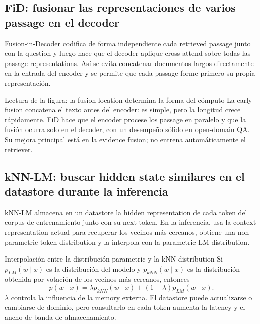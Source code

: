 
\subsection{FiD: fusionar las representaciones de varios passage en el decoder}

Fusion-in-Decoder codifica de forma independiente cada retrieved passage junto con la question y luego hace que el decoder aplique cross-attend sobre todas las passage representations. Así se evita concatenar documentos largos directamente en la entrada del encoder y se permite que cada passage forme primero su propia representación.


\begin{knowledgebox}{Lectura de la figura: la fusion location determina la forma del cómputo}
La early fusion concatena el texto antes del encoder: es simple, pero la longitud crece rápidamente. FiD hace que el encoder procese los passage en paralelo y que la fusión ocurra solo en el decoder, con un desempeño sólido en open-domain QA. Su mejora principal está en la evidence fusion; no entrena automáticamente el retriever.
\end{knowledgebox}

\subsection{kNN-LM: buscar hidden state similares en el datastore durante la inferencia}

kNN-LM almacena en un datastore la hidden representation de cada token del corpus de entrenamiento junto con su next token. En la inferencia, usa la context representation actual para recuperar los vecinos más cercanos, obtiene una non-parametric token distribution y la interpola con la parametric LM distribution.


\begin{importantbox}{Interpolación entre la distribución parametric y la kNN distribution}
Si $p_{LM}(w\mid x)$ es la distribución del modelo y $p_{kNN}(w\mid x)$ es la distribución obtenida por votación de los vecinos más cercanos, entonces
\[
p(w\mid x)=\lambda p_{kNN}(w\mid x)+(1-\lambda)p_{LM}(w\mid x).
\]
$\lambda$ controla la influencia de la memory externa. El datastore puede actualizarse o cambiarse de dominio, pero consultarlo en cada token aumenta la latency y el ancho de banda de almacenamiento.
\end{importantbox}

